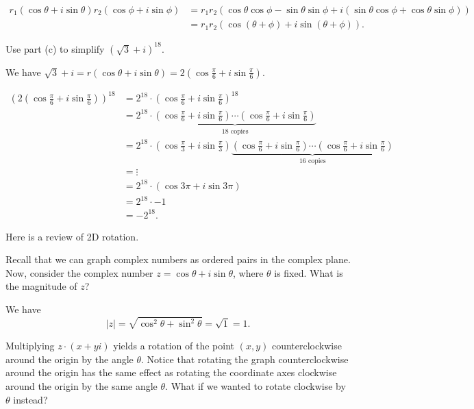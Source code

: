 \documentclass[../key.tex]{subfiles}
\begin{document}
\begin{align*}
r_1(\cos\theta + i\sin\theta)r_2(\cos\phi + i\sin\phi) &= r_1r_2(\cos\theta\cos\phi - \sin\theta\sin\phi + i(\sin\theta\cos\phi + \cos\theta\sin\phi)) \\
&= r_1r_2(\cos(\theta+\phi) + i \sin(\theta+\phi)).
\end{align*}

\begin{inner_problem}
\item Use part (c) to simplify $(\sqrt{3}+i)^{18}$.
\end{inner_problem}

\noindent We have $\sqrt{3}+i=r(\cos\theta + i\sin\theta) = 2\left(\cos\frac{\pi}{6} + i\sin\frac{\pi}{6}\right)$.

\begin{align*}
(2\left(\cos\frac{\pi}{6} + i\sin\frac{\pi}{6}\right))^{18} &= 2^{18} \cdot \left(\cos\frac{\pi}{6} + i\sin\frac{\pi}{6}\right)^{18} \\
&= 2^{18}\cdot \underbrace{\left(\cos\frac{\pi}{6} + i\sin\frac{\pi}{6}\right)\cdots \left(\cos\frac{\pi}{6} + i\sin\frac{\pi}{6}\right)}_{18\text{ copies}} \\
&= 2^{18}\cdot \left(\cos\frac{\pi}{3} + i\sin\frac{\pi}{3}\right) \underbrace{\left(\cos\frac{\pi}{6} + i\sin\frac{\pi}{6}\right)\cdots \left(\cos\frac{\pi}{6} + i\sin\frac{\pi}{6}\right)}_{16\text{ copies}} \\
&= \vdots \\
&= 2^{18}\cdot \left(\cos 3\pi + i\sin 3\pi\right) \\
&= 2^{18}\cdot -1 \\
&= -2^{18}.
\end{align*}

\begin{outer_problem}
\item Here is a review of 2D rotation.
\end{outer_problem}

\begin{inner_problem}[start=1]
\item Recall that we can graph complex numbers as ordered pairs in the complex plane. Now, consider the complex number $z=\cos \theta + i\sin\theta$, where $\theta$ is fixed. What is the magnitude of $z$?
\end{inner_problem}

\noindent We have $$|z|=\sqrt{\cos^2\theta + \sin^2\theta}=\sqrt{1}=1.$$

\begin{inner_problem}
\item Multiplying $z\cdot(x+yi)$ yields a rotation of the point $(x,y)$ counterclockwise around the origin by the angle $\theta$. Notice that rotating the graph counterclockwise around the origin has the same effect as rotating the coordinate axes clockwise around the origin by the same angle $\theta$. What if we wanted to rotate clockwise by $\theta$ instead?
\end{inner_problem}
\end{document}
